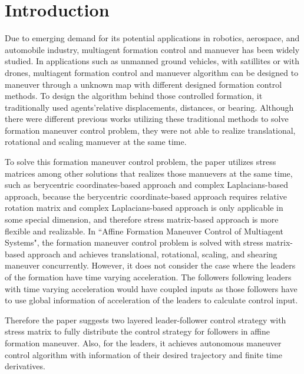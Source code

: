 \section{Introduction}\label{Introduction}

 
 Due to emerging demand for its potential applications in robotics, aerospace, and automobile industry, multiagent formation control and manuever has been widely studied. In applications such as unmanned ground vehicles, with satillites or with drones, multiagent formation control and manuever algorithm can be designed to maneuver through a unknown map with different designed formation control methods. To design the algorithm behind those controlled formation, it traditionally used agents'relative displacements, distances, or bearing. Although there were different previous works utilizing these traditional methods to solve formation maneuver control problem, they were not able to realize translational, rotational and scaling manuever at the same time. 
 
 To solve this formation maneuver control problem, the paper\cite{9064493}
  utilizes stress matrices among other solutions that realizes those manuevers at the same time, such as berycentric coordinates-based approach and complex Laplacians-based approach, because the berycentric coordinate-based approach requires relative rotation matrix and complex Laplacians-based approach is only applicable in some special dimension, and therefore stress matrix-based approach is more flexible and realizable. In ``Affine Formation Maneuver Control of Multiagent Systems"\cite{8270608}, the formation maneuver control problem is solved with stress matrix-based approach and achieves translational, rotational, scaling, and shearing maneuver concurrently. However, it does not consider the case where the leaders of the formation have time varying acceleration. The followers following leaders with time varying acceleration would have coupled inputs as those followers have to use global information of acceleration of the leaders to calculate control input. 
 
 Therefore the paper suggests two layered leader-follower control strategy with stress matrix to fully distribute the control strategy for followers in affine formation maneuver. Also, for the leaders, it achieves autonomous maneuver control algorithm with information of their desired trajectory and finite time derivatives. 
